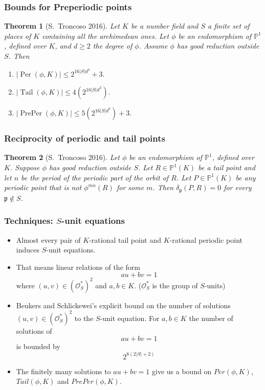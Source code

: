 \documentclass{beamer}
\def\PP{{\mathbb P}}
\def\pp{{\mathfrak p}}
\DeclareMathOperator{\Tail}{Tail}
\DeclareMathOperator{\Per}{Per}
\DeclareMathOperator{\PrePer}{PrePer}
\theoremstyle{thmstyle}
\newtheorem*{mythm}{Theorem}
\theoremstyle{mystyle}
\theoremstyle{qstnstyle}
\begin{document}
\begin{frame}
\frametitle{Bounds for Preperiodic points}
\begin{mythm}[S.\ Troncoso 2016]
Let $K$ be a number field and $S$ a finite set of places of $K$ containing all the archimedean ones. Let $\phi $ be an endomorphism of $\PP^1$, defined over $K$, and $d \geq 2$ the degree of $\phi$. Assume $\phi$ has  good reduction outside $S$. Then
\begin{enumerate}
\item [(a)] $|\Per(\phi,K)| \leq  2^{16|S|d^3}+3.$

\item [(b)] $|\Tail(\phi,K)| \leq  4(2^{16|S|d^3}) .$

\item [(c)] $|\PrePer(\phi,K)| \leq 5(2^{16|S|d^3})+3.$

\end{enumerate}
\end{mythm}
\end{frame}

\begin{frame}
\frametitle{Reciprocity of periodic and tail points}
\begin{mythm}[S.\ Troncoso 2016]
Let $\phi$ be an endomorphism of $\PP^1$, defined over $K$. Suppose $\phi$ has good reduction outside $S$. Let $R\in\PP^1(K)$ be a tail point and let $n$ be the period of the periodic part of the orbit of $R$. Let $P\in\PP^1(K)$ be any periodic point that is not $\phi^{mn}(R)$ for some $m$. Then $\delta_\pp(P,R)=0$ for every $\pp \notin S$.
\end{mythm}
\end{frame}

\begin{frame}
\frametitle{Techniques: $S$-unit equations}

\begin{itemize}
\item Almost every pair of $K$-rational tail point and $K$-rational periodic point induces $S$-unit equations.  
\item That means linear relations of the form $$au+bv=1$$  where  $(u,v) \in \left(\mathcal{O}_S^*\right)^2$ and $a,b\in{K}$. ($\mathcal{O}_S^{*}$ is the group of $S$-units)  
\item Beukers and Schlickewei's explicit bound on the number of solutions $(u,v) \in \left(\mathcal{O}_S^{*}\right)^2$ to the $S$-unit equation.  For $a,b\in{K}$ the number of solutions of $$au+bv=1$$ is bounded by $$2^{8(2|S|+2)}$$  
\item The finitely many solutions to $au+bv=1$ give us a bound on $Per(\phi,K)$, $Tail(\phi,K)$ and $PrePer(\phi,K)$. 
\end{itemize}
\end{frame}
\end{document}
